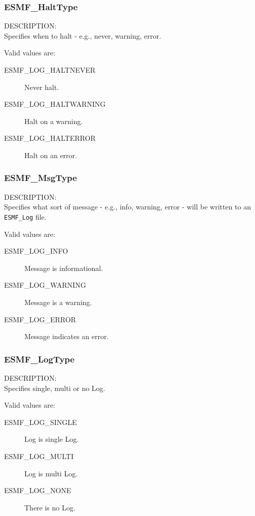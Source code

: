 

\subsubsection{ESMF\_HaltType}

\label{opt:Halttype}
{\sf DESCRIPTION:\\}
Specifies when to halt - e.g., never, warning, error.

Valid values are:
\begin{description}
   \item [ESMF\_LOG\_HALTNEVER] 
         Never halt.
   \item [ESMF\_LOG\_HALTWARNING]
         Halt on a warning.
   \item [ESMF\_LOG\_HALTERROR]
         Halt on an error.
\end{description}

\subsubsection{ESMF\_MsgType}

\label{opt:msgtype}
{\sf DESCRIPTION:\\}
Specifies what sort of message - e.g., info, warning, 
error - will be written to an {\tt ESMF\_Log} file.

Valid values are:
\begin{description}
   \item [ESMF\_LOG\_INFO] 
         Message is informational.
   \item [ESMF\_LOG\_WARNING]
         Message is a warning.
   \item [ESMF\_LOG\_ERROR]
         Message indicates an error.
\end{description}

\subsubsection{ESMF\_LogType}

\label{opt:logtype}
{\sf DESCRIPTION:\\}
Specifies single, multi or no Log.

Valid values are:
\begin{description}
   \item [ESMF\_LOG\_SINGLE] 
         Log is single Log.
   \item [ESMF\_LOG\_MULTI]
         Log is multi Log.
   \item [ESMF\_LOG\_NONE]
         There is no Log.
\end{description}





